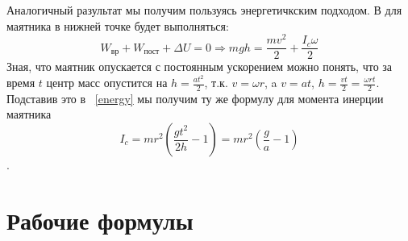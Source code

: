 \documentclass[a4paper]{article}
\begin{document}
 Аналогичный разультат мы получим пользуясь $\textbf{энергетичкским подходом}$. В для маятника в нижней точке будет выполняться:
 \begin{equation}
     W_{вр} + W_{пост} + \Delta U = 0 \Rightarrow mgh = \frac{mv^2}{2} + \frac{I_c \omega}{2}
    \label{energy}
 \end{equation}
 Зная, что маятник опускается с постоянным ускорением можно понять, что за время $t$ центр масс опустится на $h = \frac{at^2}{2}$, т.к. $v = \omega r$, a $v = at $, $h= \frac{vt}{2} = \frac{\omega r t}{2}$. Подставив это в ~\ref{energy} мы получим ту же формулу для момента инерции маятника  \[ I_c = mr^2 (\frac{gt^2}{2h}-1) = m r^2(\frac{g}{a}-1) \].
 
\section{Рабочие формулы}
\end{document}
